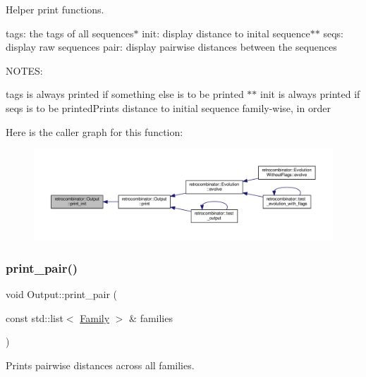 Helper print functions. 

tags\+: the tags of all sequences$\ast$ init\+: display distance to inital sequence$\ast$$\ast$ seqs\+: display raw sequences pair\+: display pairwise distances between the sequences

N\+O\+T\+ES\+:
\begin{DoxyItemize}
\item tags is always printed if something else is to be printed $\ast$$\ast$ init is always printed if seqs is to be printed\+Prints distance to initial sequence family-\/wise, in order 
\end{DoxyItemize}Here is the caller graph for this function\+:
\nopagebreak
\begin{figure}[H]
\begin{center}
\leavevmode
\includegraphics[width=350pt]{classretrocombinator_1_1Output_a365f66ac8299882ebfd6239d4c90b1bb_icgraph}
\end{center}
\end{figure}
\mbox{\label{classretrocombinator_1_1Output_ac5632b57357788ba7d25769c412a2a11}} 
\subsubsection{\texorpdfstring{print\+\_\+pair()}{print\_pair()}}
{\footnotesize\ttfamily void Output\+::print\+\_\+pair (\begin{DoxyParamCaption}\item[{const std\+::list$<$ \hyperlink{classretrocombinator_1_1Family}{Family} $>$ \&}]{families }\end{DoxyParamCaption})\hspace{0.3cm}{\ttfamily [private]}}



Prints pairwise distances across all families. 

